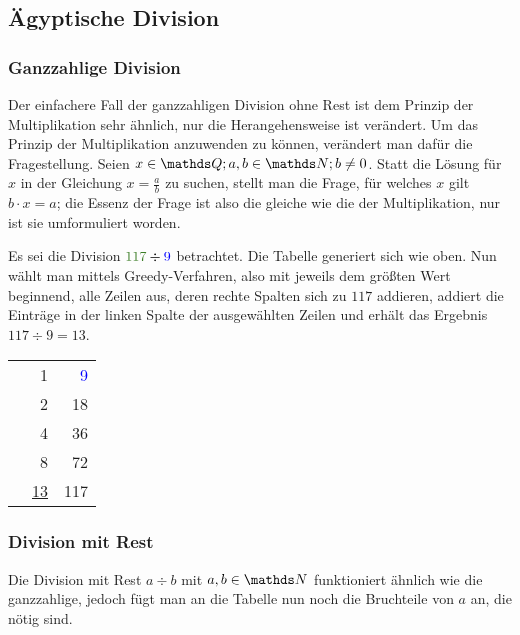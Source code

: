\subsection{Ägyptische Division}
	\subsubsection{Ganzzahlige Division}
	Der einfachere Fall der ganzzahligen Division ohne Rest ist dem Prinzip der Multiplikation sehr ähnlich, nur die Herangehensweise ist verändert. Um das Prinzip der Multiplikation anzuwenden zu können, verändert man dafür die Fragestellung. 
	Seien $x \in \Q; a,b\in \N; b \neq 0$. Statt die Lösung für $x$ in der Gleichung $x=\frac{a}{b}$ zu suchen, stellt man die Frage, für welches $x$ gilt $b \cdot x = a$; die Essenz der Frage ist also die gleiche wie die der Multiplikation, nur ist sie umformuliert worden.
	
	\begin{bsp}
		Es sei die Division $\textcolor{OliveGreen}{117} \div \textcolor{blue}{9}$ betrachtet. Die Tabelle generiert sich wie oben. Nun wählt man mittels Greedy-Verfahren, also mit jeweils dem größten Wert beginnend, alle Zeilen aus, deren rechte Spalten sich zu $117$ addieren, addiert die Einträge in der linken Spalte der ausgewählten Zeilen und erhält das Ergebnis $117 \div 9 = 13$.
		\begin{center}
			\begin{tabular}{r r r}
				\checkmark & 1 & \textcolor{blue}{9}\\
				& 2 & 18\\
				\checkmark & 4 & 36\\
				\checkmark & 8 & 72\\ \hline
				& \underline{\underline{13}} & \textcolor{OliveGreen}{117}
			\end{tabular}
		\end{center}
	\end{bsp}

	\subsubsection{Division mit Rest}
	Die Division mit Rest $a \div b$ mit $a, b \in \N$ funktioniert ähnlich wie die ganzzahlige, jedoch fügt man an die Tabelle nun noch die Bruchteile von $a$ an, die nötig sind.
	
